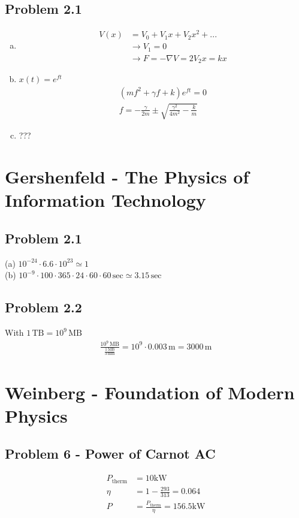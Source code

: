 \documentclass[10pt,a4paper]{book}
\theoremstyle{definition}
\begin{document}
\subsection{Problem 2.1}
\begin{enumerate}[(a)]
\item 
\begin{align}
V(x)&=V_0+V_1x+V_2x^2+...\\
&\rightarrow V_1=0\\
&\rightarrow F=-\nabla V=2V_2x=kx
\end{align}
\item $x(t)=e^{ft}$
\begin{align}
(mf^2+\gamma f+k)e^{ft}=0\\
f=-\frac{\gamma}{2m}\pm\sqrt{\frac{\gamma^2}{4m^2}-\frac{k}{m}}
\end{align}
\item ???
\end{enumerate}



\section{{\sc Gershenfeld} - The Physics of Information Technology}
\subsection{Problem 2.1}
(a) $10^{-24}\cdot6.6\cdot10^{23}\simeq1$\\
(b) $10^{-9}\cdot100\cdot365\cdot24\cdot60\cdot60\,\text{sec}\simeq3.15\,\text{sec}$
\subsection{Problem 2.2}
With $1\,\text{TB}=10^9\,\text{MB}$
\begin{align}
\frac{10^{9}\,\text{MB}}{\frac{1\,\text{MB}}{3\,\text{mm}}}
=10^{9}\cdot0.003\,\text{m}=3000\,\text{m}
\end{align}



\section{{\sc Weinberg} - Foundation of Modern Physics}

\subsection{Problem 6 - Power of Carnot AC}
\begin{align}
P_\text{therm}&=10\text{kW}\\
\eta&=1-\frac{293}{313}=0.064\\
P&=\frac{P_\text{therm}}{\eta}=156.5\text{kW}
\end{align}
\end{document}
